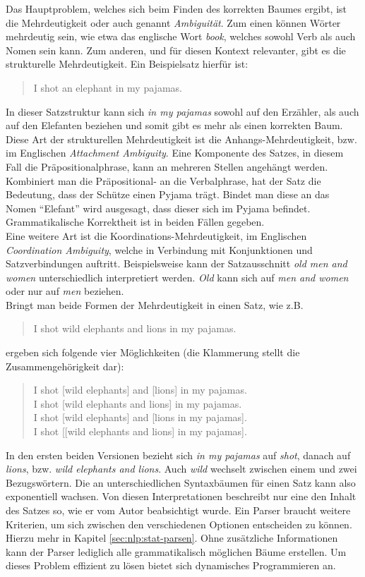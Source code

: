 Das Hauptproblem, welches sich beim Finden des korrekten Baumes ergibt, ist die Mehrdeutigkeit oder auch genannt \textit{Ambiguität}. Zum einen können Wörter mehrdeutig sein, wie etwa das englische Wort \textit{book}, welches sowohl Verb als auch Nomen sein kann. Zum anderen, und für diesen Kontext relevanter, gibt es die strukturelle Mehrdeutigkeit. Ein Beispielsatz hierfür ist: 
\begin{quote}
I shot an elephant in my pajamas.
\end{quote}
In dieser Satzstruktur kann sich \textit{in my pajamas} sowohl auf den Erzähler, als auch auf den Elefanten beziehen und somit gibt es mehr als einen korrekten Baum. \\ 
Diese Art der strukturellen Mehrdeutigkeit ist die Anhangs-Mehrdeutigkeit, bzw. im Englischen \textit{Attachment Ambiguity}. Eine Komponente des Satzes, in diesem Fall die Präpositionalphrase, kann an mehreren Stellen angehängt werden. Kombiniert man die Präpositional- an die Verbalphrase, hat der Satz die Bedeutung, dass der Schütze einen Pyjama trägt. Bindet man diese an das Nomen ``Elefant'' wird ausgesagt, dass dieser sich im Pyjama befindet. Grammatikalische Korrektheit ist in beiden Fällen gegeben. \\
Eine weitere Art ist die Koordinations-Mehrdeutigkeit, im Englischen \textit{Coordination Ambiguity}, welche in Verbindung mit Konjunktionen und Satzverbindungen auftritt. Beispielsweise kann der Satzausschnitt \textit{old men and women} unterschiedlich interpretiert werden. \textit{Old} kann sich auf \textit{men and women} oder nur auf \textit{men} beziehen. \\
Bringt man beide Formen der Mehrdeutigkeit in einen Satz, wie z.B. 
\begin{quote}
I shot wild elephants and lions in my pajamas.
\end{quote}
ergeben sich folgende vier Möglichkeiten (die Klammerung stellt die Zusammengehörigkeit dar): %
\begin{quote}
I shot [wild elephants] and [lions] in my pajamas.\\
I shot [wild elephants and lions] in my pajamas.\\
I shot [wild elephants] and [lions in my pajamas].\\
I shot [[wild elephants and lions] in my pajamas].\\
\end{quote}
In den ersten beiden Versionen bezieht sich \textit{in my pajamas} auf \textit{shot}, danach auf \textit{lions}, bzw. \textit{wild elephants and lions}. Auch \textit{wild} wechselt zwischen einem und zwei Bezugswörtern. Die an unterschiedlichen Syntaxbäumen für einen Satz kann also exponentiell wachsen. %
Von diesen Interpretationen beschreibt nur eine den Inhalt des Satzes so, wie er vom Autor beabsichtigt wurde. Ein Parser braucht weitere Kriterien, um sich zwischen den verschiedenen Optionen entscheiden zu können. Hierzu mehr in Kapitel \ref{sec:nlp:stat-parsen}. Ohne zusätzliche Informationen kann der Parser lediglich alle grammatikalisch möglichen Bäume erstellen. Um dieses Problem effizient zu lösen bietet sich dynamisches Programmieren an. \cite[Kapitel 11]{nlpGrundlagen}


